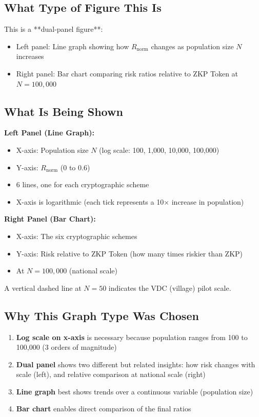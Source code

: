 \documentclass[12pt,a4paper,oneside,openany]{report}
\begin{document}
\subsection{What Type of Figure This Is}
This is a **dual-panel figure**:
\begin{itemize}
    \item Left panel: Line graph showing how $R_{\mathrm{norm}}$ changes as population size $N$ increases
    \item Right panel: Bar chart comparing risk ratios relative to ZKP Token at $N=100,000$
\end{itemize}

\subsection{What Is Being Shown}

\textbf{Left Panel (Line Graph):}
\begin{itemize}
    \item X-axis: Population size $N$ (log scale: 100, 1,000, 10,000, 100,000)
    \item Y-axis: $R_{\mathrm{norm}}$ (0 to 0.6)
    \item 6 lines, one for each cryptographic scheme
    \item X-axis is logarithmic (each tick represents a 10× increase in population)
\end{itemize}

\textbf{Right Panel (Bar Chart):}
\begin{itemize}
    \item X-axis: The six cryptographic schemes
    \item Y-axis: Risk relative to ZKP Token (how many times riskier than ZKP)
    \item At $N=100,000$ (national scale)
\end{itemize}

A vertical dashed line at $N=50$ indicates the VDC (village) pilot scale.

\subsection{Why This Graph Type Was Chosen}
\begin{enumerate}
    \item \textbf{Log scale on x-axis} is necessary because population ranges from 100 to 100,000 (3 orders of magnitude)
    \item \textbf{Dual panel} shows two different but related insights: how risk changes with scale (left), and relative comparison at national scale (right)
    \item \textbf{Line graph} best shows trends over a continuous variable (population size)
    \item \textbf{Bar chart} enables direct comparison of the final ratios
\end{enumerate}
\end{document}
